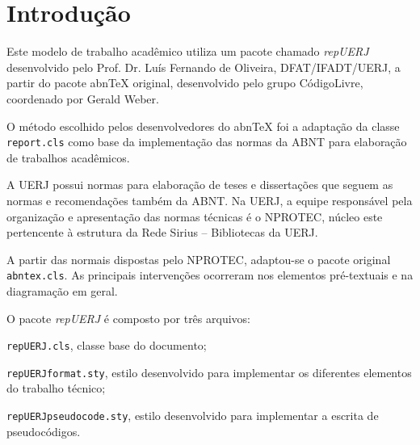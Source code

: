 \documentclass[a4paper,12pt,oneside,onecolumn,final,fleqn]{repUERJ}
\begin{document}




\sumario


\mainmatter %

\chapter*{Introdução}

Este modelo de trabalho acadêmico utiliza um pacote chamado \textsl{repUERJ} desenvolvido pelo Prof. Dr. Luís Fernando de Oliveira, DFAT/IFADT/UERJ, a partir do pacote \textsf{abnTeX} original, desenvolvido pelo grupo CódigoLivre, coordenado por Gerald Weber.

O método escolhido pelos desenvolvedores do \textsf{abnTeX} foi a adaptação da classe \texttt{report.cls} como base da implementação das normas da ABNT para elaboração de trabalhos acadêmicos.

A UERJ possui normas para elaboração de teses e dissertações que seguem as normas e recomendações também da ABNT. Na UERJ, a equipe responsável pela organização e apresentação das normas técnicas é o NPROTEC, núcleo este pertencente à estrutura da Rede Sirius -- Bibliotecas da UERJ.

A partir das normais dispostas pelo NPROTEC, adaptou-se o pacote original \texttt{abntex.cls}. As principais intervenções ocorreram nos elementos pré-textuais e na diagramação em geral.

O pacote \textsl{repUERJ} é composto por três arquivos: 
\begin{itemizacao}
\item \texttt{repUERJ.cls}, classe base do documento;
\item \texttt{repUERJformat.sty}, estilo desenvolvido para implementar os diferentes elementos do trabalho técnico;
\item \texttt{repUERJpseudocode.sty}, estilo desenvolvido para implementar a escrita de pseudocódigos.
\end{itemizacao}
\end{document}
